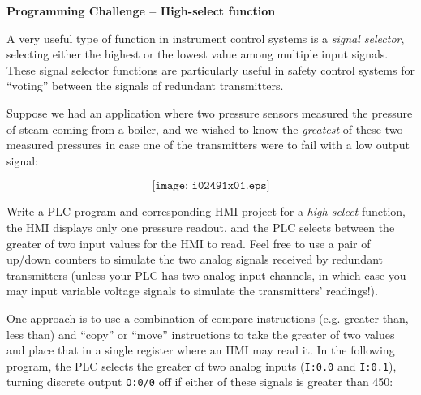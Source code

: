 

\noindent
{\bf Programming Challenge -- High-select function} 

\vskip 10pt

A very useful type of function in instrument control systems is a {\it signal selector}, selecting either the highest or the lowest value among multiple input signals.  These signal selector functions are particularly useful in safety control systems for ``voting'' between the signals of redundant transmitters.  

Suppose we had an application where two pressure sensors measured the pressure of steam coming from a boiler, and we wished to know the {\it greatest} of these two measured pressures in case one of the transmitters were to fail with a low output signal:

$$\texttt{[image: i02491x01.eps]}$$

\vskip 10pt

Write a PLC program and corresponding HMI project for a {\it high-select} function, the HMI displays only one pressure readout, and the PLC selects between the greater of two input values for the HMI to read.  Feel free to use a pair of up/down counters to simulate the two analog signals received by redundant transmitters (unless your PLC has two analog input channels, in which case you may input variable voltage signals to simulate the transmitters' readings!).














One approach is to use a combination of compare instructions (e.g. greater than, less than) and ``copy'' or ``move'' instructions to take the greater of two values and place that in a single register where an HMI may read it.  In the following program, the PLC selects the greater of two analog inputs ({\tt I:0.0} and {\tt I:0.1}), turning discrete output {\tt O:0/0} off if either of these signals is greater than 450:

